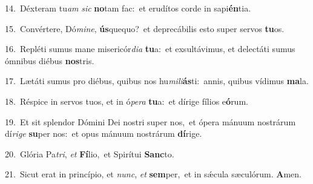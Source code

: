 {\numbfont\textcolor{\numbcolor}{14.}}~Déxteram tu\textit{am} \textit{sic} \textbf{no}\-tam fac:~\star et erudítos corde in sapi\-\textbf{én}\-tia.\par
{\numbfont\textcolor{\numbcolor}{15.}}~Convértere, Dó\-\textit{mi}\-\textit{ne}, \textbf{ús}\-quequo?~\star et deprecábilis esto super servos \textbf{tu}\-os.\par
{\numbfont\textcolor{\numbcolor}{16.}}~Repléti sumus mane misericór\-\textit{di}\-\textit{a} \textbf{tu}\-a:~\star et exsultávimus, et delectáti sumus ómnibus diébus \textbf{nos}\-tris.\par
{\numbfont\textcolor{\numbcolor}{17.}}~Lætáti sumus pro diébus, quibus nos hu\-\textit{mi}\-\textit{li}\textbf{ás}ti:~\star annis, quibus vídimus \textbf{ma}\-la.\par
{\numbfont\textcolor{\numbcolor}{18.}}~Réspice in servos tuos, et in ó\-\textit{pe}\-\textit{ra} \textbf{tu}\-a:~\star et dírige fílios e\-\textbf{ó}\-rum.\par
{\numbfont\textcolor{\numbcolor}{19.}}~Et sit splendor Dómini Dei nostri super nos,~\dagger et ópera mánuum nostrárum dí\-\textit{ri}\-\textit{ge} \textbf{su}\-per nos:~\star et opus mánuum nostrárum \textbf{dí}\-rige.\par
{\numbfont\textcolor{\numbcolor}{20.}}~Glória Pa\-\textit{tri}\-, \textit{et} \textbf{Fí}\-lio,~\star et Spirítui \textbf{Sanc}\-to.\par
{\numbfont\textcolor{\numbcolor}{21.}}~Sicut erat in princípio, et \textit{nunc}\-, \textit{et} \textbf{sem}\-per,~\star et in sǽcula sæculórum. \textbf{A}\-men.\par
